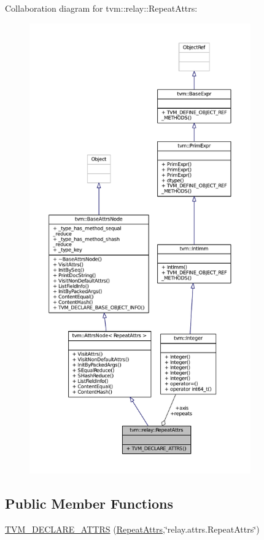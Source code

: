 Collaboration diagram for tvm\+:\+:relay\+:\+:Repeat\+Attrs\+:
\nopagebreak
\begin{figure}[H]
\begin{center}
\leavevmode
\includegraphics[height=550pt]{structtvm_1_1relay_1_1RepeatAttrs__coll__graph}
\end{center}
\end{figure}
\subsection*{Public Member Functions}
\begin{DoxyCompactItemize}
\item 
\hyperlink{structtvm_1_1relay_1_1RepeatAttrs_a9beb4e18ba35d6323f7463dbb4f95c1b}{T\+V\+M\+\_\+\+D\+E\+C\+L\+A\+R\+E\+\_\+\+A\+T\+T\+RS} (\hyperlink{structtvm_1_1relay_1_1RepeatAttrs}{Repeat\+Attrs},\char`\"{}relay.\+attrs.\+Repeat\+Attrs\char`\"{})
\end{DoxyCompactItemize}
